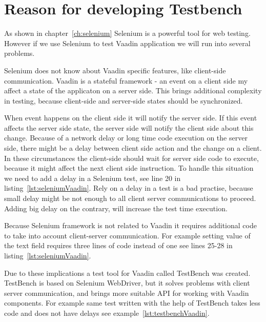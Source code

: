 \chapter{Reason for developing Testbench}
\label{ch:reasontestbenchdevelopment}
As shown in chapter~\ref{ch:selenium} Selenium is a powerful tool for web
testing.
However if we use Selenium to test Vaadin application we will run into several problems.

Selenium does not know about Vaadin specific features, like client-side	communication. 
Vaadin is a stateful framework - an event on a client side my affect a state of
the applicaton on a server side. This brings additional complexity in testing,
because client-side and server-side states should be synchronized.

When event happens on the client side it will notify the server side. If this event affects the server side state, the
server side will notify the client side about this change.
 Because of a network delay or long time code execution on the server side,
 there might be a delay between client side action and the change on a client. 
 In these circumstances the client-side should wait for server side code to execute,
  because it might affect the next client side instruction. To handle this
  situation we need to add a delay in a Selenium test, see line 20
   in listing~\ref{lst:seleniumVaadin}. Rely on a delay in a test is a bad
   practise, because small delay might be not enough to all client server
   communications to proceed. Adding big delay on the contrary, will increase
   the test time execution. 
   
 Because Selenium framework is not related to Vaadin it requires additional
   code to take into account client-server communication. For example setting
   value of the text field requires three lines of code instead of one see lines
   25-28 in listing~\ref{lst:seleniumVaadin}.
   
   Due to these implications a test tool for Vaadin called TestBench was
   created. TestBench is based on Selenium WebDriver, but it solves
   problems with client server communication, and brings more suitable
   API for working with Vaadin components. For example same test written with 
   the help of TestBench takes less code and does not have delays see example~\ref{lst:testbenchVaadin}.
  	
